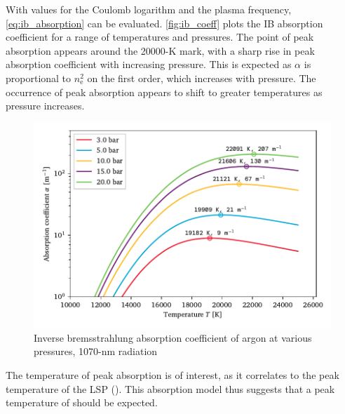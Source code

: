         With values for the Coulomb logarithm and the plasma frequency, \autoref{eq:ib_absorption} can be evaluated. \autoref{fig:ib_coeff} plots the IB absorption coefficient for a range of temperatures and pressures. The point of peak absorption appears around the \num{20000}-\unit{K} mark, with a sharp rise in peak absorption coefficient with increasing pressure. This is expected as $\alpha$ is proportional to $n_\mathrm{e}^2$ on the first order, which increases with pressure. The occurrence of peak absorption appears to shift to greater temperatures as pressure increases.

        \begin{figure}[h]
            \centering
            \includegraphics[]{assets/4 models/absorption}
            \caption{Inverse bremsstrahlung absorption coefficient of argon at various pressures, \num{1070}-\unit{nm} radiation}
            \label{fig:ib_coeff}
        \end{figure}

        The temperature of peak absorption is of interest, as it correlates to the peak temperature of the LSP (\textcite{keeferLaserSustainedPlasmas1989}). This absorption model thus suggests that a peak temperature of  should be expected. 
    

